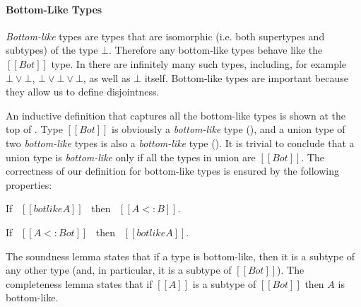 \paragraph{Bottom-Like Types}
\emph{Bottom-like} types are types that are isomorphic (i.e.
both supertypes and subtypes) of the type $\bot$. Therefore
any bottom-like types behave like the $[[Bot]]$ type.
In \name there
are infinitely many such types, including, for example $\bot \lor \bot$,
$\bot \lor \bot \lor \bot$, as well as $\bot$ itself. Bottom-like types
are important because they allow us to define disjointness.

An inductive definition that captures all the bottom-like types
is shown at the top of .
Type $[[Bot]]$ is obviously a \emph{bottom-like} type
(), and a union type of two \emph{bottom-like} types is also
a \emph{bottom-like} type ().  It is trivial to conclude
that a union type is \emph{bottom-like} only if all the 
types in union are $[[Bot]]$. The correctness of our definition for
bottom-like types is ensured by the following properties:

\begin{lemma}
  If \ $[[botlike A]]$ \ then \ $[[A <: B]]$.
\label{lemma:union:bl-soundness}
\end{lemma}

\begin{comment}
\begin{proof}
  By induction on bottom-like relation.
  \begin{itemize}
    \item All cases are trivial to prove.
  \end{itemize}
\end{proof}
\end{comment}

\begin{lemma}
  If \ $[[A <: Bot]]$ \ then \ $[[botlike A]]$.
\label{lemma:union:bl-completeness}
\end{lemma}

\noindent The soundness lemma states that if a type is bottom-like, then it is
a subtype of any other type (and, in particular, it is a subtype of $[[Bot]]$).
The completeness lemma states that if $[[A]]$ is a subtype of $[[Bot]]$ then $A$
is bottom-like.

